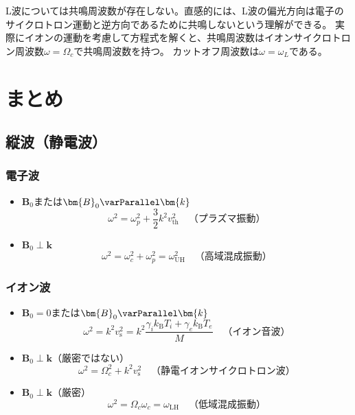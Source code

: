 L波については共鳴周波数が存在しない。直感的には、L波の偏光方向は電子のサイクロトロン運動と逆方向であるために共鳴しないという理解ができる。
実際にイオンの運動を考慮して方程式を解くと、共鳴周波数はイオンサイクロトロン周波数$\omega=\Omega_c$で共鳴周波数を持つ。
カットオフ周波数は$\omega=\omega_L$である。


\section{まとめ}
\subsection{縦波（静電波）}
\subsubsection*{電子波}
\begin{itemize}
	\item $\bm{B}_0$または$\bm{B}_0\varParallel \bm{k}$
	      \begin{equation}
		      \omega^2 = \omega_p^2 + \frac{3}{2}k^2v^2_{\text{th}}\quad\text{（プラズマ振動）}
	      \end{equation}
	\item $\bm{B}_0\perp\bm{k}$
	      \begin{equation}
		      \omega^2 = \omega^2_{c} + \omega^2_{p} = \omega^2_{\text{UH}}\quad\text{（高域混成振動）}
	      \end{equation}
\end{itemize}
\subsubsection*{イオン波}
\begin{itemize}
	\item $\bm{B}_0=0$または$\bm{B}_0\varParallel \bm{k}$
	      \begin{equation}
		      \omega^2 = k^2v_{\text{s}}^2 = k^2\frac{\gamma_ik_{\text{B}}T_i + \gamma_ek_{\text{B}}T_e}{M}\quad\text{（イオン音波）}
	      \end{equation}
	\item $\bm{B}_0\perp\bm{k}$（厳密ではない）
	      \begin{equation}
		      \omega^2 = \Omega_c^2 + k^2v_{\text{s}}^2\quad\text{（静電イオンサイクロトロン波）}
	      \end{equation}
	\item $\bm{B}_0\perp\bm{k}$（厳密）
	      \begin{equation}
		      \omega^2 = \Omega_c\omega_c = \omega_{\text{LH}}\quad\text{（低域混成振動）}
	      \end{equation}
\end{itemize}
